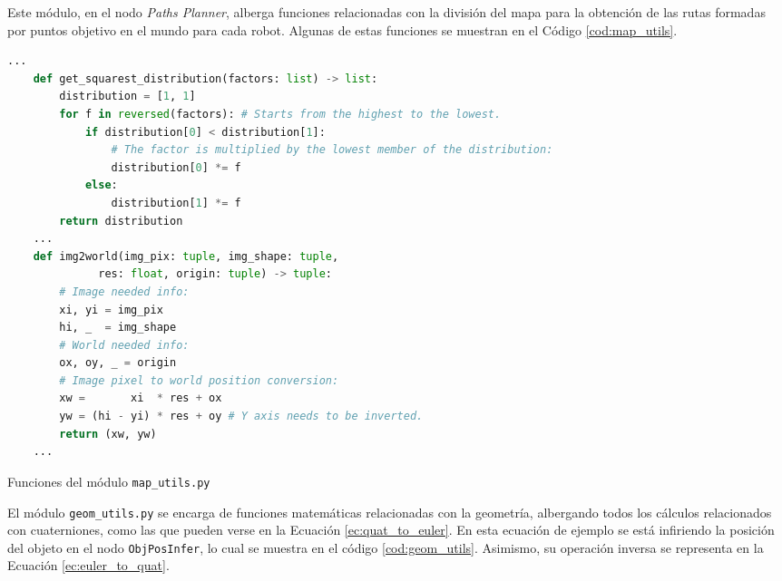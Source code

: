 Este módulo, en el nodo \textit{Paths Planner}, alberga funciones relacionadas
con la división del mapa para la obtención de las rutas formadas por puntos
objetivo en el mundo para cada robot.
Algunas de estas funciones se muestran en el Código \ref{cod:map_utils}.
\\

\begin{code}[h!]
  \begin{lstlisting}[language=Python]
    ...
    def get_squarest_distribution(factors: list) -> list:
        distribution = [1, 1]
        for f in reversed(factors): # Starts from the highest to the lowest.
            if distribution[0] < distribution[1]:
                # The factor is multiplied by the lowest member of the distribution:
                distribution[0] *= f
            else:
                distribution[1] *= f
        return distribution
    ...
    def img2world(img_pix: tuple, img_shape: tuple,
              res: float, origin: tuple) -> tuple:
        # Image needed info:
        xi, yi = img_pix
        hi, _  = img_shape
        # World needed info:
        ox, oy, _ = origin
        # Image pixel to world position conversion:
        xw =       xi  * res + ox
        yw = (hi - yi) * res + oy # Y axis needs to be inverted.
        return (xw, yw)
    ...
  \end{lstlisting}
\caption[Funciones del módulo \texttt{map\_utils.py}]{Funciones del módulo \texttt{map\_utils.py}}
\label{cod:map_utils}
\end{code}

El módulo \texttt{geom\_utils.py} se encarga de funciones matemáticas
relacionadas con la geometría, albergando todos los cálculos relacionados con
cuaterniones, como las que pueden verse en la Ecuación \ref{ec:quat_to_euler}.
En esta ecuación de ejemplo se está infiriendo la posición del objeto en el nodo
\verb|ObjPosInfer|, lo cual se muestra en el código \ref{cod:geom_utils}.
Asimismo, su operación inversa se representa en la Ecuación
\ref{ec:euler_to_quat}.
\\

